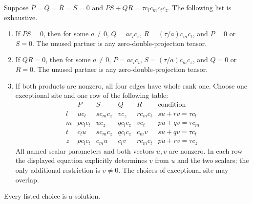 \begin{lemma}\label{atlas:crossing}
Suppose \(\overline P=\overline Q=\overline R=\overline S=0\) and
\(PS+QR=\tau c_lc_mc_tc_z\).  The following list is exhaustive.
\begin{enumerate}
\item If \(PS=0\), then for some \(a\ne0\),
\(Q=a c_lc_z\), \(R=(\tau/a)c_mc_t\), and \(P=0\) or \(S=0\).
The unused partner is any zero-double-projection tensor.
\item If \(QR=0\), then for some \(a\ne0\),
\(P=a c_lc_t\), \(S=(\tau/a)c_mc_z\), and \(Q=0\) or \(R=0\).
The unused partner is any zero-double-projection tensor.
\item If both products are nonzero, all four edges have whole rank one.
Choose one exceptional site and one row of the following table:
\[
\begin{array}{c|cccc|c}
 &P&S&Q&R&\text{condition}\\ \hline
 l&u c_t&s c_mc_z&v c_z&r c_mc_t&su+rv=\tau c_l\\
 m&p c_lc_t&u c_z&q c_lc_z&v c_t&pu+qv=\tau c_m\\
 t&c_lu&s c_mc_z&q c_lc_z&c_mv&su+qv=\tau c_t\\
 z&p c_lc_t&c_mu&c_lv&r c_mc_t&pu+rv=\tau c_z
\end{array}
\]
All named scalar parameters and both vectors \(u,v\) are nonzero.
In each row the displayed equation explicitly determines \(v\) from \(u\)
and the two scalars; the only additional restriction is \(v\ne0\).
The choices of exceptional site may overlap.
\end{enumerate}
Every listed choice is a solution.
\end{lemma}

